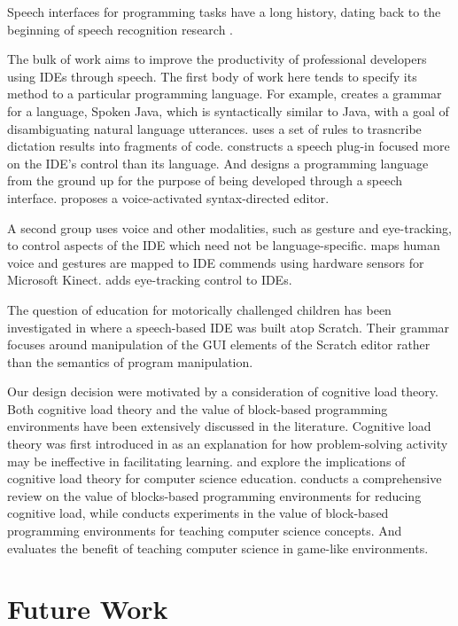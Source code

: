 \documentclass[]{article}
\begin{document}
Speech interfaces for programming tasks have a long history, dating back to the
beginning of speech recognition research \cite{bolt1980put}.

The bulk of work aims to improve the productivity of professional developers
using IDEs through speech. The first body of work here tends to specify its
method to a particular programming language. For example,
\cite{Begel05programmingby} creates a grammar for a language, Spoken Java, which
is syntactically similar to Java, with a goal of disambiguating natural language
utterances. \cite{desilets2006voicecode} uses a set of rules to trasncribe
dictation results into fragments of code. \cite{shaik2003speechclipse}
constructs a speech plug-in focused more on the IDE's control than its language.
And \cite{gordon2011developing} designs a programming language from the ground
up for the purpose of being developed through a speech interface.
\cite{hubbell2006voice} proposes a voice-activated syntax-directed editor.

A second group uses voice and other modalities, such as gesture and
eye-tracking, to control aspects of the IDE which need not be language-specific.
\cite{delimarschi2014enabling} maps human voice and gestures are mapped to IDE
commends using hardware sensors for Microsoft Kinect. \cite{glucker2014eyede}
adds eye-tracking control to IDEs.

The question of education for motorically challenged children has been
investigated in \cite{wagner2012programming} where a speech-based IDE was built
atop Scratch. Their grammar focuses around manipulation of the GUI elements of
the Scratch editor rather than the semantics of program manipulation.

Our design decision were motivated by a consideration of cognitive load theory.
Both cognitive load theory and the value of block-based programming environments
have been extensively discussed in the literature. Cognitive load theory was
first introduced in \cite{sweller1988cognitive} as an explanation for how
problem-solving activity may be ineffective in facilitating learning.
\cite{shaffer2003applying} and \cite{nolan2015examining} explore the
implications of cognitive load theory for computer science education.
\cite{bau2017learnable} conducts a comprehensive review on the value of
blocks-based programming environments for reducing cognitive load, while
\cite{meerbaum2013learning} conducts experiments in the value of block-based
programming environments for teaching computer science concepts. And
\cite{gibson2013evaluation} evaluates the benefit of teaching computer science
in game-like environments.





\section{Future Work}



\end{document}
